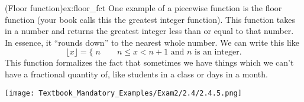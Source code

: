 \documentclass{article}
\begin{document}
\begin{example}{(Floor function)}{ex:floor_fct}
    One example of a piecewise function is the floor function (your book calls this the greatest integer function). This function takes in a number and returns the greatest integer less than or equal to that number. In essence, it ``rounds down'' to the nearest whole number. We can write this like \[\lfloor x\rfloor=\bigl\{\;n\qquad n\leq x<n+1 \text{ and $n$ is an integer}\bigr.\] This function formalizes the fact that sometimes we have things which we can't have a fractional quantity of, like students in a class or days in a month.
\end{example}

\texttt{[image: Textbook\_Mandatory\_Examples/Exam2/2.4/2.4.5.png]}
\end{document}
